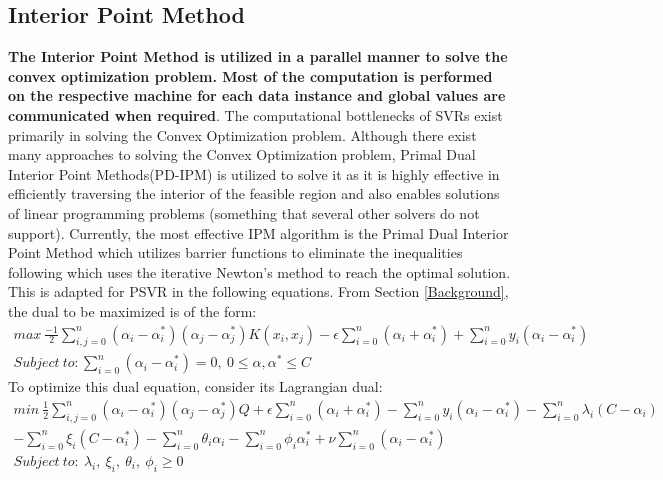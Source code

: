 \documentclass[12pt]{article}
\begin{document}
 \subsection{Interior Point Method}
 \label{Interior Point Method}
  {\bf The Interior Point Method is utilized in a parallel manner to solve the convex optimization problem. Most of the computation is performed on the respective machine for each data instance and global values are communicated when required}.
  \newline\newline
 The computational bottlenecks of SVRs exist primarily in solving the Convex Optimization problem. Although there exist many approaches to solving the Convex Optimization problem, Primal Dual Interior Point Methods(PD-IPM) is utilized to solve it as it is highly effective in efficiently traversing the interior of the feasible region and also enables solutions of linear programming problems (something that several other solvers do not support).
\newline
Currently, the most effective IPM algorithm is the Primal Dual Interior Point Method which utilizes barrier functions to eliminate the inequalities following which uses the iterative Newton's method to reach the optimal solution.
\newline
 This is adapted for PSVR in the following equations.
 \newline\newline
From Section \ref{Background}, the dual to be maximized is of the form: 
\begin{gather*} 
 max\  \frac{-1}{2}\sum_{i, j=0}^{n}{(\alpha_{i} - \alpha_{i}^*)(\alpha_{j} - \alpha_{j}^*)K(x_{i}, x_{j})} - \epsilon\sum_{i=0}^{n}{(\alpha_{i} + \alpha_{i}^*)}+\sum_{i=0}^{n}{y_{i}(\alpha_{i} - \alpha_{i}^*)}   \\
 Subject \ to: \sum_{i=0}^{n}{(\alpha_{i} - \alpha_{i}^*)} = 0, \ 0\leq\alpha, \alpha^*\leq C
 \end{gather*}
 \newline
To optimize this dual equation, consider its Lagrangian dual:
 \begin{gather*} 
min\  \frac{1}{2}\sum_{i, j=0}^{n}{(\alpha_{i} - \alpha_{i}^*)(\alpha_{j} - \alpha_{j}^*)Q} + \epsilon\sum_{i=0}^{n}{(\alpha_{i} + \alpha_{i}^*)}-\sum_{i=0}^{n}{y_{i}(\alpha_{i} - \alpha_{i}^*)}-\sum_{i=0}^{n}{\lambda_{i}(C-\alpha_{i})}\\-\sum_{i=0}^{n}{\xi_{i}(C-\alpha^*_{i})}-\sum_{i=0}^{n}{\theta_{i}\alpha_{i}}-\sum_{i=0}^{n}{\phi_{i}\alpha^*_{i}}+\nu\sum_{i=0}^{n}{(\alpha_{i} - \alpha_{i}^*)}\\
Subject \ to:\ \lambda_{i},\ \xi_{i},\ \theta_{i},\ \phi_{i} \geq 0
 \end{gather*}
\end{document}
